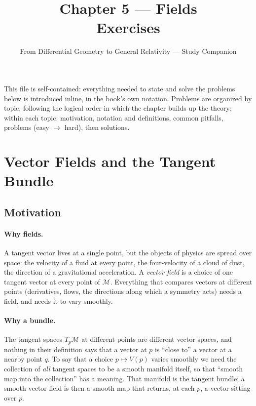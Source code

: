 \documentclass[11pt]{article}
\title{Chapter 5 --- Fields\\ \large Exercises}
\author{From Differential Geometry to General Relativity --- Study Companion}
\date{}
\newcommand{\TpM}{T_p\mathcal M}
\begin{document}
\maketitle

\noindent This file is self-contained: everything needed to state and solve
the problems below is introduced inline, in the book's own notation. Problems
are organized by topic, following the logical order in which the chapter
builds up the theory; within each topic: motivation, notation and
definitions, common pitfalls, problems (easy $\to$ hard), then solutions.

\section{Vector Fields and the Tangent Bundle}

\subsection*{Motivation}

\paragraph{Why fields.}
A tangent vector lives at a single point, but the objects of physics are spread over space: the velocity of a fluid at every point, the four-velocity of a cloud of dust, the direction of a gravitational acceleration. A \emph{vector field} is a choice of one tangent vector at every point of $\mathcal M$. Everything that compares vectors at different points (derivatives, flows, the directions along which a symmetry acts) needs a field, and needs it to vary smoothly.

\paragraph{Why a bundle.}
The tangent spaces $\TpM$ at different points are different vector spaces, and nothing in their definition says that a vector at $p$ is ``close to'' a vector at a nearby point $q$. To say that a choice $p\mapsto V(p)$ varies smoothly we need the collection of \emph{all} tangent spaces to be a smooth manifold itself, so that ``smooth map into the collection'' has a meaning. That manifold is the tangent bundle; a smooth vector field is then a smooth map that returns, at each $p$, a vector sitting over $p$.
\end{document}
